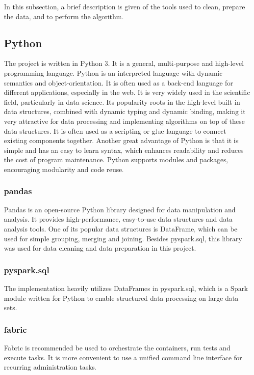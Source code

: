 In this subsection, a brief description is given of the tools used to clean, prepare the data, and to perform the algorithm.

\subsection{Python}
The project is written in Python 3. It is a general, multi-purpose and high-level programming language. Python is an interpreted language with dynamic semantics and object-orientation. It is often used as a back-end language for different applications, especially in the web. It is very widely used in the scientific field, particularly in data science. Its popularity roots in the high-level built in data structures, combined with dynamic typing and dynamic binding, making it very attractive for data processing and implementing algorithms on top of these data structures. 
It is often used as a scripting or glue language to connect existing components together. Another great advantage of Python is that it is simple and has an easy to learn syntax, which enhances readability and reduces the cost of program maintenance. Python supports modules and packages, encouraging modularity and code reuse. \cite{python}

\subsubsection{pandas}
Pandas is an open-source Python library designed for data manipulation and analysis. It provides high-performance, easy-to-use data structures and data analysis tools. One of its popular data structures is DataFrame, which can be used for simple grouping, merging and joining. Besides pyspark.sql, this library was used for data cleaning and data preparation in this project.

\subsubsection{pyspark.sql}
The implementation heavily utilizes DataFrames in pyspark.sql, which is a Spark module written for Python to enable structured data processing on large data sets. 

\subsubsection{fabric}
Fabric is recommended be used to orchestrate the containers, run tests and execute tasks. It is more convenient to use a unified command line interface for recurring administration tasks. \cite{fabric}


